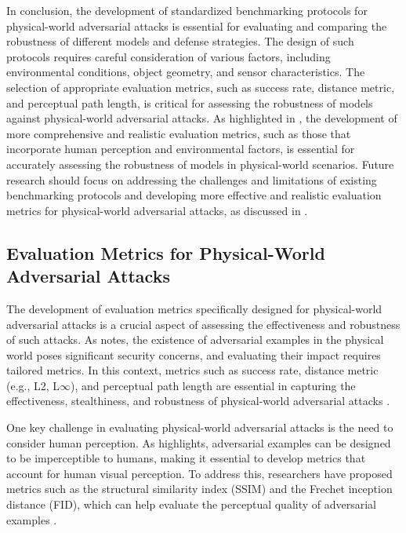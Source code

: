 \documentclass[11pt,a4paper]{article}
\begin{document}
In conclusion, the development of standardized benchmarking protocols for physical-world adversarial attacks is essential for evaluating and comparing the robustness of different models and defense strategies. The design of such protocols requires careful consideration of various factors, including environmental conditions, object geometry, and sensor characteristics. The selection of appropriate evaluation metrics, such as success rate, distance metric, and perceptual path length, is critical for assessing the robustness of models against physical-world adversarial attacks. As highlighted in \cite{doi:10.1007/978-3-030-58589-1_3}, the development of more comprehensive and realistic evaluation metrics, such as those that incorporate human perception and environmental factors, is essential for accurately assessing the robustness of models in physical-world scenarios. Future research should focus on addressing the challenges and limitations of existing benchmarking protocols and developing more effective and realistic evaluation metrics for physical-world adversarial attacks, as discussed in \cite{doi:10.1016/j.eng.2019.12.012}.


\subsection{Evaluation Metrics for Physical-World Adversarial Attacks}


The development of evaluation metrics specifically designed for physical-world adversarial attacks is a crucial aspect of assessing the effectiveness and robustness of such attacks. As \cite{doi:10.24963/ijcai.2021/694} notes, the existence of adversarial examples in the physical world poses significant security concerns, and evaluating their impact requires tailored metrics. In this context, metrics such as success rate, distance metric (e.g., L2, L$\infty$), and perceptual path length are essential in capturing the effectiveness, stealthiness, and robustness of physical-world adversarial attacks \cite{arxiv:1707.07397}.

One key challenge in evaluating physical-world adversarial attacks is the need to consider human perception. As \cite{doi:10.1145/3128572.3140444} highlights, adversarial examples can be designed to be imperceptible to humans, making it essential to develop metrics that account for human visual perception. To address this, researchers have proposed metrics such as the structural similarity index (SSIM) and the Frechet inception distance (FID), which can help evaluate the perceptual quality of adversarial examples \cite{doi:10.1109/iccvw.2019.00257}.
\end{document}
